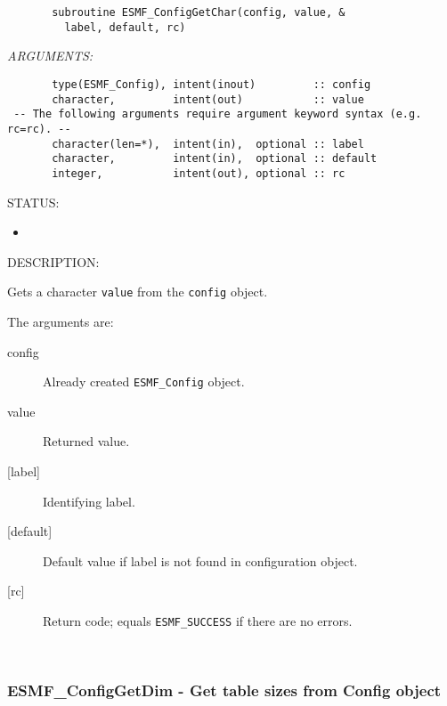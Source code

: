   
\begin{verbatim}       subroutine ESMF_ConfigGetChar(config, value, &
         label, default, rc)
 \end{verbatim}{\em ARGUMENTS:}
\begin{verbatim}       type(ESMF_Config), intent(inout)         :: config 
       character,         intent(out)           :: value
 -- The following arguments require argument keyword syntax (e.g. rc=rc). --
       character(len=*),  intent(in),  optional :: label   
       character,         intent(in),  optional :: default
       integer,           intent(out), optional :: rc    \end{verbatim}
{\sf STATUS:}
   \begin{itemize}
   \item{}
   \end{itemize}
  
{\sf DESCRIPTION:\\ }

 
    Gets a character {\tt value} from the {\tt config} object.
  
     The arguments are:
     \begin{description}
     \item [config]
       Already created {\tt ESMF\_Config} object.
     \item [value]
       Returned value. 
     \item [{[label]}]
       Identifying label. 
     \item [{[default]}]
       Default value if label is not found in configuration object. 
     \item [{[rc]}]
       Return code; equals {\tt ESMF\_SUCCESS} if there are no errors.
     \end{description}
  
   
 
\mbox{}\hrulefill\ 
 

  \subsubsection [ESMF\_ConfigGetDim] {ESMF\_ConfigGetDim - Get table sizes from Config object}


